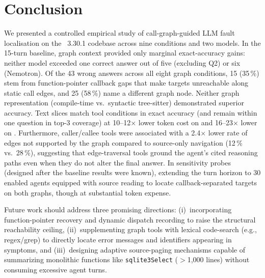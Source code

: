 \section{Conclusion}
\label{sec:conclusion}

We presented a controlled empirical study of call-graph-guided LLM fault
localisation on the \sqlite~3.30.1 codebase across nine conditions and two models.
In the 15-turn baseline, graph context provided only marginal exact-accuracy gains:
neither model exceeded one correct answer out of five (excluding Q2) or six (Nemotron).
Of the 43 wrong answers across all eight graph conditions, 15 (35\,\%) stem from
function-pointer callback gaps that make targets unreachable along static call edges,
and 25 (58\,\%) name a different graph node.
Neither graph representation (compile-time \clang vs.\ syntactic tree-sitter) demonstrated
superior accuracy.
Text slices match tool conditions in exact accuracy (and remain within one question in top-3
coverage) at 10--12$\times$ lower token cost on \qwen and 16--23$\times$ lower on \nemotron.
Furthermore, caller/callee tools were associated with a 2.4$\times$ lower rate of
edges not supported by the graph compared to source-only navigation (12\,\% vs.\ 28\,\%),
suggesting that edge-traversal tools ground the agent's cited reasoning paths even
when they do not alter the final answer.
In sensitivity probes (designed after the baseline results were known), extending the turn horizon to 30 enabled agents equipped with
source reading to locate callback-separated targets on both graphs, though at substantial
token expense.

Future work should address three promising directions: (i)~incorporating function-pointer
recovery and dynamic dispatch recording to raise the structural reachability ceiling,
(ii)~supplementing graph tools with lexical code-search (e.g., regex/grep) to directly locate
error messages and identifiers appearing in symptoms, and (iii)~designing adaptive source-paging
mechanisms capable of summarizing monolithic functions like \texttt{sqlite3Select} ($>$1{,}000 lines)
without consuming excessive agent turns.
